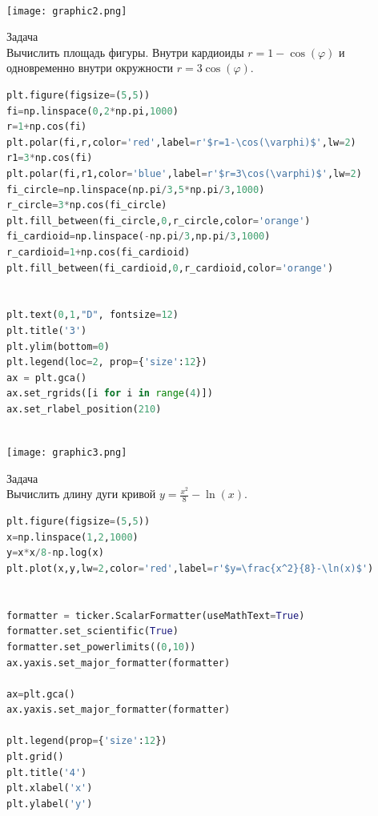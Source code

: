 \documentclass{article}
\begin{document}
\\
\texttt{[image: graphic2.png]}






\newpage
\begin{section}{Задача}\\

Вычислить площадь фигуры. Внутри кардиоиды $r=1-\cos(\varphi)$ и одновременно внутри окружности $r=3\cos(\varphi)$.
\\
\begin{lstlisting}[language=Python]
plt.figure(figsize=(5,5))
fi=np.linspace(0,2*np.pi,1000)
r=1+np.cos(fi)
plt.polar(fi,r,color='red',label=r'$r=1-\cos(\varphi)$',lw=2)
r1=3*np.cos(fi)
plt.polar(fi,r1,color='blue',label=r'$r=3\cos(\varphi)$',lw=2)
fi_circle=np.linspace(np.pi/3,5*np.pi/3,1000)
r_circle=3*np.cos(fi_circle)
plt.fill_between(fi_circle,0,r_circle,color='orange')
fi_cardioid=np.linspace(-np.pi/3,np.pi/3,1000)
r_cardioid=1+np.cos(fi_cardioid)
plt.fill_between(fi_cardioid,0,r_cardioid,color='orange')


plt.text(0,1,"D", fontsize=12)
plt.title('3')
plt.ylim(bottom=0)
plt.legend(loc=2, prop={'size':12})
ax = plt.gca()
ax.set_rgrids([i for i in range(4)])
ax.set_rlabel_position(210)
\end{lstlisting}


\end{section}

\\
\texttt{[image: graphic3.png]}




\newpage
\begin{section}{Задача}\\

Вычислить длину дуги кривой $y=\frac{x^2}{8}-\ln(x)$. 
\\
\begin{lstlisting}[language=Python]
plt.figure(figsize=(5,5))
x=np.linspace(1,2,1000)
y=x*x/8-np.log(x)
plt.plot(x,y,lw=2,color='red',label=r'$y=\frac{x^2}{8}-\ln(x)$')


formatter = ticker.ScalarFormatter(useMathText=True)
formatter.set_scientific(True) 
formatter.set_powerlimits((0,10)) 
ax.yaxis.set_major_formatter(formatter) 

ax=plt.gca()
ax.yaxis.set_major_formatter(formatter)

plt.legend(prop={'size':12})
plt.grid()
plt.title('4')
plt.xlabel('x')
plt.ylabel('y')

\end{lstlisting}


\end{section}
\end{document}

